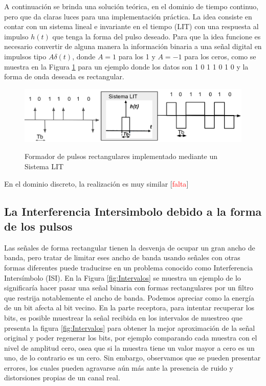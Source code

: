 A continuación se brinda una solución teórica, en el dominio de tiempo continuo, pero que da claras luces para una implementación práctica. La idea consiste en contar con un sistema lineal e invariante en el tiempo (LIT) con una respuesta al impulso $h(t)$ que tenga la forma del pulso deseado. Para que la idea funcione es necesario convertir de alguna manera la información binaria a una señal digital en impulsos tipo $A \delta (t)$, donde $A=1$ para los 1 y $A=-1$ para los ceros, como se muestra en la Figura  \ref{fig:Secuencia1} para un  ejemplo donde los datos son 1 0 1 1 0 1 0 y la forma de onda deseada es rectangular.
\begin{figure}[h!]
	\captionsetup{justification = raggedright, singlelinecheck = false}
	\caption{Formador de pulsos rectangulares implementado mediante un Sistema LIT} 
	\centering
	\includegraphics[scale=0.3]{Imagenes/waveform_rect.jpg}
	\label{fig:Secuencia1}
\end{figure}

En el dominio discreto, la realización es muy similar [\textcolor{red}{falta}]

\subsection{La Interferencia Intersimbolo debido a la forma de los pulsos}

Las señales de forma rectangular tienen la desvenja de ocupar un gran ancho de banda, pero tratar de limitar eses ancho de banda usando señales con otras formas diferentes puede traducirse en un problema conocido como Interferencia Intersímbolo (ISI). En la Figura \ref{fig:Intervalos} se muestra un ejemplo de lo significaría hacer pasar una señal binaria con formas rectangulares por un filtro que restrija notablemente el ancho de banda. Podemos apreciar como la energía de un bit afecta al bit vecino. En la parte receptora, para intentar recuperar los bits, es posible muestrear la señal recibida en los intervalos de muestreo que presenta la figura \ref{fig:Intervalos} para obtener la mejor aproximación de la señal original y poder regenerar los bits, por ejemplo comparando cada muestra con el nivel de amplitud cero, osea que si la muestra tiene un valor mayor a cero es un uno, de lo contrario es un cero. Sin embargo, observamos que se pueden presentar errores, los cuales pueden agravarse aún más ante la presencia de ruido y distorsiones propias de un canal real. \\

